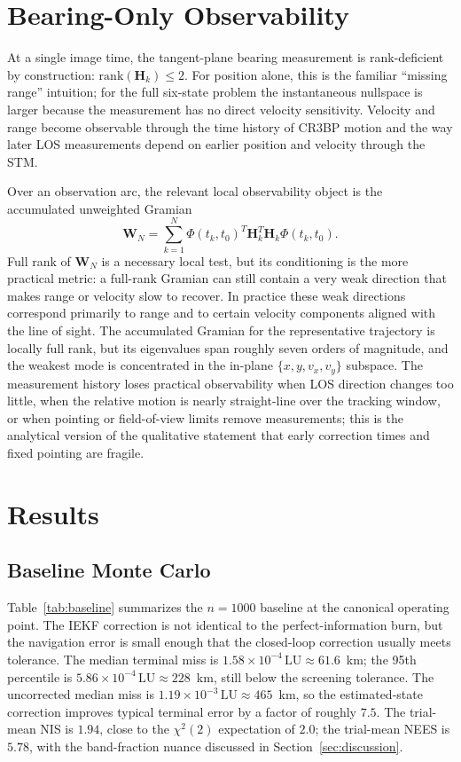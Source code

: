 \documentclass[10pt,twocolumn]{article}
\newcommand{\mat}[1]{\mathbf{#1}}
\newcommand{\LU}{\mathrm{LU}}
\newcommand{\chisq}{\chi^2}
\begin{document}
\section{Bearing-Only Observability}
\label{sec:obs}
At a single image time, the tangent-plane bearing measurement is rank-deficient by construction: $\mathrm{rank}(\mat{H}_k)\le 2$.  For position alone, this is the familiar ``missing range'' intuition; for the full six-state problem the instantaneous nullspace is larger because the measurement has no direct velocity sensitivity.  Velocity and range become observable through the time history of CR3BP motion and the way later LOS measurements depend on earlier position and velocity through the STM.

Over an observation arc, the relevant local observability object is the accumulated unweighted Gramian
\begin{equation}
\mat{W}_N=\sum_{k=1}^{N}\Phi(t_k,t_0)^T\mat{H}_k^T\mat{H}_k\Phi(t_k,t_0).
\label{eq:gramian}
\end{equation}
Full rank of $\mat{W}_N$ is a necessary local test, but its conditioning is the more practical metric: a full-rank Gramian can still contain a very weak direction that makes range or velocity slow to recover.  In practice these weak directions correspond primarily to range and to certain velocity components aligned with the line of sight.  The accumulated Gramian for the representative trajectory is locally full rank, but its eigenvalues span roughly seven orders of magnitude, and the weakest mode is concentrated in the in-plane $\{x,y,v_x,v_y\}$ subspace.  The measurement history loses practical observability when LOS direction changes too little, when the relative motion is nearly straight-line over the tracking window, or when pointing or field-of-view limits remove measurements; this is the analytical version of the qualitative statement that early correction times and fixed pointing are fragile.

\section{Results}
\label{sec:results}

\subsection{Baseline Monte Carlo}
\label{sec:results-baseline}
Table~\ref{tab:baseline} summarizes the $n=1000$ baseline at the canonical operating point.  The IEKF correction is not identical to the perfect-information burn, but the navigation error is small enough that the closed-loop correction usually meets tolerance.  The median terminal miss is $1.58\times10^{-4}\,\LU\approx 61.6$~km; the 95th percentile is $5.86\times10^{-4}\,\LU\approx 228$~km, still below the screening tolerance.  The uncorrected median miss is $1.19\times10^{-3}\,\LU\approx 465$~km, so the estimated-state correction improves typical terminal error by a factor of roughly $7.5$.  The trial-mean NIS is $1.94$, close to the $\chisq(2)$ expectation of $2.0$; the trial-mean NEES is $5.78$, with the band-fraction nuance discussed in Section~\ref{sec:discussion}.
\end{document}
